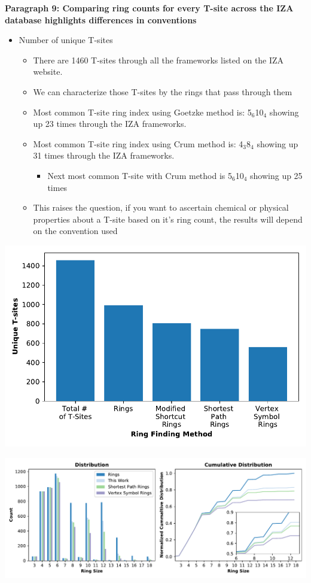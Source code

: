 \documentclass[11pt]{article}
\begin{document}
\textbf{\textbf{Paragraph 9: Comparing ring counts for every T-site across the IZA database highlights differences in conventions}}
\begin{itemize}
\item Number of unique T-sites
\begin{itemize}
\item There are 1460 T-sites through all the frameworks listed on the IZA website.
\item We can characterize those T-sites by the rings that pass through them
\item Most common T-site ring index using Goetzke method is: 5\(_{\text{6}}\)\textbullet{}10\(_{\text{4}}\) showing up 23 times through the IZA frameworks.
\item Most common T-site ring index using Crum method is: 4\(_{\text{3}}\)\textbullet{}8\(_{\text{4}}\) showing up 31 times through the IZA frameworks.
\begin{itemize}
\item Next most common T-site with Crum method is 5\(_{\text{6}}\)\textbullet{}10\(_{\text{4}}\) showing up 25 times
\end{itemize}
\item This raises the question, if you want to ascertain chemical or physical properties about a T-site based on it's ring count, the results will depend on the convention used
\end{itemize}
\end{itemize}
\begin{center}
\includegraphics[width=.6\textwidth]{../figures/completed-figures/unique-ts.pdf}
\end{center}

\begin{center}
\includegraphics[width=.8\textwidth]{../figures/completed-figures/dist-cumudist.pdf}
\end{center}
\end{document}
